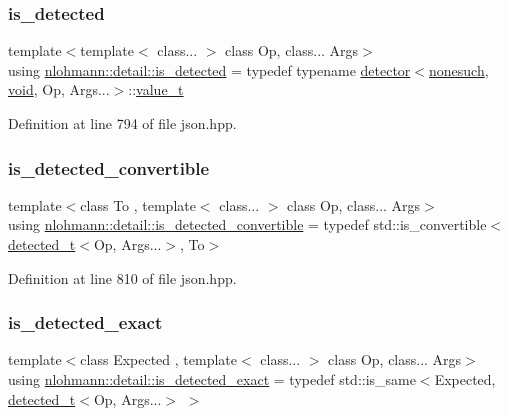 \subsubsection{\texorpdfstring{is\_detected}{is\_detected}}
{\footnotesize\ttfamily template$<$template$<$ class... $>$ class Op, class... Args$>$ \\
using \mbox{\hyperlink{namespacenlohmann_1_1detail_a9135fcf616d6ac6e231a86e0a055ac44}{nlohmann\+::detail\+::is\+\_\+detected}} = typedef typename \mbox{\hyperlink{structnlohmann_1_1detail_1_1detector}{detector}}$<$\mbox{\hyperlink{structnlohmann_1_1detail_1_1nonesuch}{nonesuch}}, \mbox{\hyperlink{namespacenlohmann_1_1detail_a59fca69799f6b9e366710cb9043aa77d}{void}}, Op, Args...$>$\+::\mbox{\hyperlink{namespacenlohmann_1_1detail_a1ed8fc6239da25abcaf681d30ace4985}{value\+\_\+t}}}



Definition at line 794 of file json.\+hpp.

\mbox{\label{namespacenlohmann_1_1detail_a5262e531c46e357b33007060f294673b}} 
\subsubsection{\texorpdfstring{is\_detected\_convertible}{is\_detected\_convertible}}
{\footnotesize\ttfamily template$<$class To , template$<$ class... $>$ class Op, class... Args$>$ \\
using \mbox{\hyperlink{namespacenlohmann_1_1detail_a5262e531c46e357b33007060f294673b}{nlohmann\+::detail\+::is\+\_\+detected\+\_\+convertible}} = typedef std\+::is\+\_\+convertible$<$\mbox{\hyperlink{namespacenlohmann_1_1detail_a37e97a32d0b94ce5f745427e4e40204d}{detected\+\_\+t}}$<$Op, Args...$>$, To$>$}



Definition at line 810 of file json.\+hpp.

\mbox{\label{namespacenlohmann_1_1detail_a7542b4dbac07817fd4849ecfa4619def}} 
\subsubsection{\texorpdfstring{is\_detected\_exact}{is\_detected\_exact}}
{\footnotesize\ttfamily template$<$class Expected , template$<$ class... $>$ class Op, class... Args$>$ \\
using \mbox{\hyperlink{namespacenlohmann_1_1detail_a7542b4dbac07817fd4849ecfa4619def}{nlohmann\+::detail\+::is\+\_\+detected\+\_\+exact}} = typedef std\+::is\+\_\+same$<$Expected, \mbox{\hyperlink{namespacenlohmann_1_1detail_a37e97a32d0b94ce5f745427e4e40204d}{detected\+\_\+t}}$<$Op, Args...$>$ $>$}



